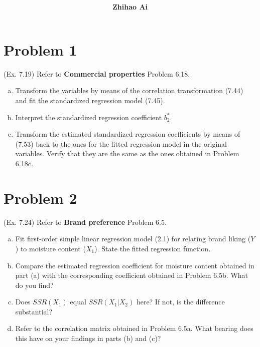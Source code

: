 \documentclass[10pt]{report}
\title{
	\vspace{2in}
	\textmd{\textbf{\hwCourse\\\hwTitle}}\\
	\vspace{0.3in}\large{\textit{\hmClassInstructor}}
	\vspace{3in}
}
\author{\textbf{Zhihao Ai}}
\date{}
\begin{document}
\maketitle

\section*{Problem 1}
(Ex. 7.19) Refer to \textbf{Commercial properties}  Problem 6.18.
\begin{enumerate}[a.]
	\item 
	Transform the variables by means of the correlation transformation (7.44) and fit the standardized regression model (7.45).
	
	\item 
	Interpret the standardized regression coefficient $b^*_2$.
	
	\item 
	Transform the estimated standardized regression coefficients by means of (7.53) back to the ones for the fitted regression model in the original variables. Verify that they are the same as the ones obtained in Problem 6.18c.
\end{enumerate}

\section*{Problem 2}
(Ex. 7.24) Refer to \textbf{Brand preference}  Problem 6.5.
\begin{enumerate}[a.]
	\item 
	Fit first-order simple linear regression model (2.1) for relating brand liking ($Y$) to moisture content ($X_1$). State the fitted regression function.
	
	\item 
	Compare the estimated regression coefficient for moisture content obtained in part (a) with the corresponding coefficient obtained in Problem 6.5b. What do you find?
	
	\item 
	Does $SSR(X_1)$ equal $SSR(X_1|X_2)$ here? If not, is the difference substantial?
	
	\item 
	Refer to the correlation matrix obtained in Problem 6.5a. What bearing does this have on your findings in parts (b) and (c)?
\end{enumerate}
\end{document}
